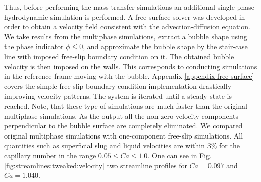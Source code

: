 \documentclass[review,12pt]{elsarticle}
\begin{document}
\begin{description}
Thus, before performing the mass transfer simulations an additional single phase hydrodynamic
simulation is performed. A free-surface solver was developed in order to obtain a velocity field
consistent with the advection-diffusion equation. We take results from the
multiphase simulations, extract a
bubble shape using the phase indicator $\phi\leq0$, and approximate the bubble shape by the stair-case
line with imposed free-slip boundary condition on it. The obtained bubble velocity is then imposed on the walls. This corresponds to conducting 
simulations in the reference frame moving with the bubble. Appendix \ref{appendix-free-surface} covers the simple
free-slip boundary condition implementation drastically improving velocity patterns. The system is
iterated until a
steady state is reached. Note, that these type of simulations are much faster than the original
multiphase simulations. As the output all the non-zero velocity components perpendicular to the
bubble surface are completely eliminated. We compared original multiphase simulations with
one-component free-slip simulations. All quantities such as superficial slug and liquid velocities are
within $3\%$ for the capillary number in the range $0.05\leq Ca \leq 1.0$. 
One can see in Fig. \ref{fig:streamlines:tweaked:velocity} two streamline profiles for $Ca=0.097$  and $Ca=1.040$.
\begin{figure}[htb!]

\end{figure}
\end{description}
\end{document}
